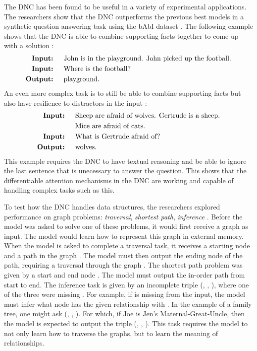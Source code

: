The DNC has been found to be useful in a variety of experimental applications.
The researchers show that the DNC outperforms the previous best models in
a synthetic question answering task using the bAbI dataset
\cite{graves2016hybrid}. The following example shows that the DNC is able to
combine supporting facts together to come up with a solution
\cite{graves2016hybrid}:
\begin{align*}
\textnormal{\bf{Input: }}  & \quad \textnormal{John is in the playground. John
                                               picked up the football.} \\
\textnormal{\bf{Input: }}  & \quad \textnormal{Where is the football?} \\
\textnormal{\bf{Output: }} & \quad \textnormal{playground.}
\end{align*}
An even more complex task is to still be able to combine supporting facts
but also have resilience to distractors in the input \cite{graves2016hybrid}:
\begin{align*}
\textnormal{\bf{Input: }}  & \quad \textnormal{Sheep are afraid of wolves.
                             Gertrude is a sheep.} \\
                           & \quad \textnormal{Mice are afraid of cats.} \\
\textnormal{\bf{Input: }}  & \quad \textnormal{What is Gertrude afraid of?} \\
\textnormal{\bf{Output: }} & \quad \textnormal{wolves.}
\end{align*}
This example requires the DNC to have textual reasoning and be able to ignore
the last sentence that is unecessary to answer the question. This shows that
the differentiable attention mechanisms in the DNC are working and capable
of handling complex tasks such as this.

To test how the DNC handles data structures, the researchers explored
performance on graph problems: \textit{traversal}, \textit{shortest path},
\textit{inference} \cite{graves2016hybrid}. Before the model was asked to solve
one of these problems, it would first receive a graph as input. The model would
learn how to represent this graph in external memory. When the model is asked
to complete a traversal task, it receives a starting node and a path in the
graph \cite{graves2016hybrid}. The model must then output the ending node of
the path, requiring a traversal through the graph \cite{graves2016hybrid}.
The shortest path problem was given by a start and end node
\cite{graves2016hybrid}. The model must output the in-order path from start to
end. The inference task is given by an incomplete triple
(, , ), where one of the
three were missing \cite{graves2016hybrid}. For example, if  is
missing from the input, the model must infer what node has the given
relationship with . In the example of a family tree, one
might ask (, \quotes{\_}, ). For which,
if Joe is Jen's Maternal-Great-Uncle, then the model is expected to output
the triple (, , ). This task
requires the model to not only learn how to traverse the graphs, but to learn
the meaning of relationships.


